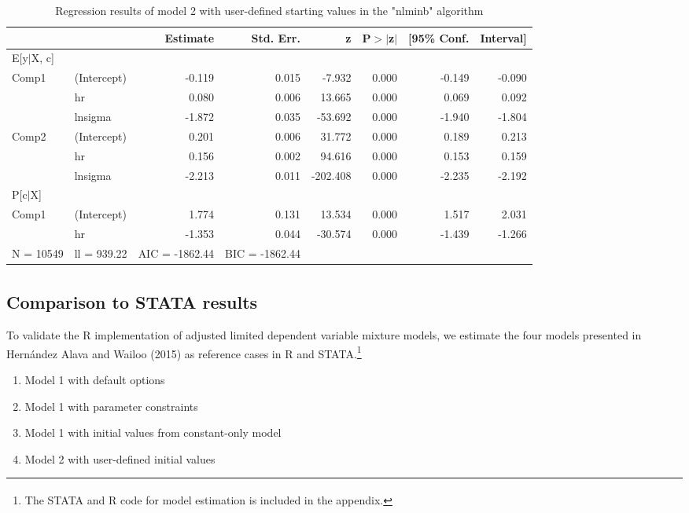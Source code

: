 \documentclass[
]{article}
\begin{document}
\begin{table}[ht]
\centering
\caption{Regression results of model 2 with user-defined 
                     starting values in the "nlminb" algorithm} 
\label{tab:tab-sum-mod2}
\begin{tabular}{llrrrrrr}
  \hline
 &  & Estimate & Std. Err. & z & P$>$$|$z$|$ & [95\% Conf.  & Interval] \\ 
  \hline
E[y$|$X, c] &  &  &  &  &  &  &  \\ 
   \hline
Comp1 & (Intercept) & -0.119 & 0.015 & -7.932 & 0.000 & -0.149 & -0.090 \\ 
   & hr &  0.080 & 0.006 & 13.665 & 0.000 &  0.069 &  0.092 \\ 
   & lnsigma & -1.872 & 0.035 & -53.692 & 0.000 & -1.940 & -1.804 \\ 
  Comp2 & (Intercept) & 0.201 & 0.006 & 31.772 & 0.000 & 0.189 & 0.213 \\ 
   & hr & 0.156 & 0.002 & 94.616 & 0.000 & 0.153 & 0.159 \\ 
   & lnsigma & -2.213 & 0.011 & -202.408 & 0.000 & -2.235 & -2.192 \\ 
   \hline
P[c$|$X] &  &  &  &  &  &  &  \\ 
   \hline
Comp1 & (Intercept) &  1.774 & 0.131 &  13.534 & 0.000 &  1.517 &  2.031 \\ 
   & hr & -1.353 & 0.044 & -30.574 & 0.000 & -1.439 & -1.266 \\ 
   \hline
N = 10549 & ll = 939.22 & AIC = -1862.44 & BIC = -1862.44 &  &  &  &  \\ 
  \end{tabular}
\end{table}

\hypertarget{comparison-to-stata-results}{%
\subsection{\texorpdfstring{Comparison to STATA\textsuperscript{\textregistered} results}{Comparison to STATA results}}\label{comparison-to-stata-results}}

To validate the R implementation of adjusted limited dependent variable mixture models, we estimate the four models presented in Hernández Alava and Wailoo (2015) as reference cases in R and STATA\textsuperscript{\textregistered}.\footnote{The STATA\textsuperscript{\textregistered} and R code for model estimation is included in the appendix.}

\begin{enumerate}
\def\labelenumi{\arabic{enumi}.}
\item
  Model 1 with default options
\item
  Model 1 with parameter constraints
\item
  Model 1 with initial values from constant-only model
\item
  Model 2 with user-defined initial values
\end{enumerate}
\end{document}
